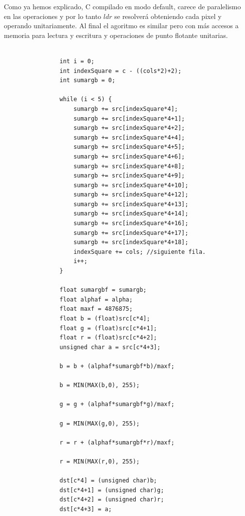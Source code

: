 Como ya hemos explicado, C compilado en modo default, carece de paralelismo en las operaciones y por lo tanto $ldr$ se resolverá obteniendo cada pixel y operando unitariamente. Al final el agoritmo es similar pero con más accesos a memoria para lectura y escritura y operaciones de punto flotante unitarias.

\begin{codesnippet}
\begin{verbatim}
                
                int i = 0;
                int indexSquare = c - ((cols*2)+2);
                int sumargb = 0;
                
                while (i < 5) {
                    sumargb += src[indexSquare*4];
                    sumargb += src[indexSquare*4+1];
                    sumargb += src[indexSquare*4+2];
                    sumargb += src[indexSquare*4+4];
                    sumargb += src[indexSquare*4+5];
                    sumargb += src[indexSquare*4+6];
                    sumargb += src[indexSquare*4+8];
                    sumargb += src[indexSquare*4+9];
                    sumargb += src[indexSquare*4+10];
                    sumargb += src[indexSquare*4+12];
                    sumargb += src[indexSquare*4+13];
                    sumargb += src[indexSquare*4+14];
                    sumargb += src[indexSquare*4+16];
                    sumargb += src[indexSquare*4+17];
                    sumargb += src[indexSquare*4+18];
                    indexSquare += cols; //siguiente fila.
                    i++;
                }

                float sumargbf = sumargb;
                float alphaf = alpha;
                float maxf = 4876875;
                float b = (float)src[c*4];
                float g = (float)src[c*4+1];
                float r = (float)src[c*4+2];
                unsigned char a = src[c*4+3];

                b = b + (alphaf*sumargbf*b)/maxf;

                b = MIN(MAX(b,0), 255);

                g = g + (alphaf*sumargbf*g)/maxf;

                g = MIN(MAX(g,0), 255);

                r = r + (alphaf*sumargbf*r)/maxf;

                r = MIN(MAX(r,0), 255);

                dst[c*4] = (unsigned char)b;
                dst[c*4+1] = (unsigned char)g;
                dst[c*4+2] = (unsigned char)r;
                dst[c*4+3] = a;
                
\end{verbatim}
\end{codesnippet}

